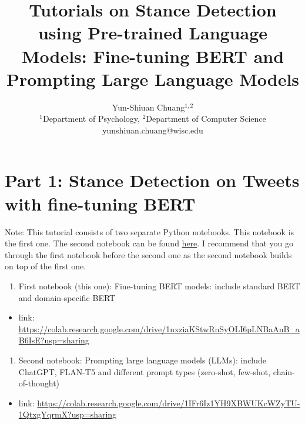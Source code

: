 \documentclass[11pt]{article}
\title{Tutorials on Stance Detection using Pre-trained Language Models: Fine-tuning BERT and Prompting Large Language Models}
\author{Yun-Shiuan Chuang$^{1,2}$\\
	\small $^{1}$Department of Psychology, $^{2}$Department of Computer Science\\
	\small yunshiuan.chuang@wisc.edu}
\date{}
\providecommand{\tightlist}{%
      \setlength{\itemsep}{0pt}\setlength{\parskip}{0pt}}
\begin{document}
    
    \maketitle
    
    

    
    \hypertarget{stance-detection-on-tweets-using-nlp-methods---part-1}{%
\section{Part 1: Stance Detection on Tweets with fine-tuning BERT}\label{stance-detection-on-tweets-using-nlp-methods---part-1}}

Note: This tutorial consists of two separate Python notebooks. This
notebook is the first one. The second notebook can be found
\href{https://colab.research.google.com/drive/1IFr6Iz1YH9XBWUKcWZyTU-1QtxgYqrmX?usp=sharing}{here}.
I recommend that you go through the first notebook before the second one
as the second notebook builds on top of the first one.

\begin{enumerate}
\def\labelenumi{\arabic{enumi}.}
\tightlist
\item
  First notebook (this one): Fine-tuning BERT models: include standard
  BERT and domain-specific BERT
\end{enumerate}

\begin{itemize}
\tightlist
\item
  link:
  \href{https://colab.research.google.com/drive/1nxziaKStwRnSyOLI6pLNBaAnB_aB6IsE?usp=sharing}{https://colab.research.google.com/drive/1nxziaKStwRnSyOLI6pLNBaAnB_aB6IsE?usp=sharing}
\end{itemize}

\begin{enumerate}
\def\labelenumi{\arabic{enumi}.}
\setcounter{enumi}{1}
\tightlist
\item
  Second notebook: Prompting large language models (LLMs): include
  ChatGPT, FLAN-T5 and different prompt types (zero-shot, few-shot,
  chain-of-thought)
\end{enumerate}

\begin{itemize}
\tightlist
\item
  link:
  \href{https://colab.research.google.com/drive/1IFr6Iz1YH9XBWUKcWZyTU-1QtxgYqrmX?usp=sharing}{https://colab.research.google.com/drive/1IFr6Iz1YH9XBWUKcWZyTU-1QtxgYqrmX?usp=sharing}
\end{itemize}
\end{document}
